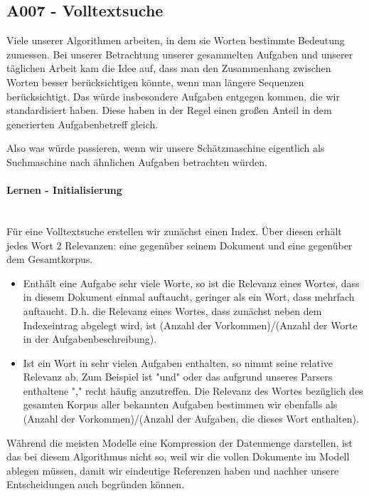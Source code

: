 \newpage{}

\subsection{A007 - Volltextsuche}

Viele unserer Algorithmen arbeiten, in dem sie Worten bestimmte Bedeutung zumessen.
Bei unserer Betrachtung unserer gesammelten Aufgaben und unserer täglichen Arbeit kam die Idee auf, dass man den Zusammenhang zwischen Worten besser berücksichtigen könnte, wenn man längere Sequenzen berücksichtigt. 
Das würde insbesondere Aufgaben entgegen kommen, die wir standardisiert haben.
Diese haben in der Regel einen großen Anteil in dem generierten Aufgabenbetreff gleich.

Also was würde passieren, wenn wir unsere Schätzmaschine eigentlich als Suchmaschine nach ähnlichen Aufgaben betrachten würden.

\paragraph{Lernen - Initialisierung}
\mbox{}\\

Für eine Volltextsuche erstellen wir zunächst einen Index. Über diesen erhält jedes Wort 2 Relevanzen: eine gegenüber seinem Dokument und eine gegenüber dem Gesamtkorpus.

\begin{itemize}
        \tightlist
        \item Enthält eine Aufgabe sehr viele Worte, so ist die Relevanz eines Wortes, dass in diesem Dokument einmal auftaucht, geringer als ein Wort, dass mehrfach auftaucht. D.h. die Relevanz eines Wortes, dass zunächst neben dem Indexeintrag abgelegt wird, ist (Anzahl der Vorkommen)/(Anzahl der Worte in der Aufgabenbeschreibung).
        \item Ist ein Wort in sehr vielen Aufgaben enthalten, so nimmt seine relative Relevanz ab. Zum Beispiel ist "und" oder das aufgrund unseres Parsers enthaltene "," recht häufig anzutreffen. Die Relevanz des Wortes bezüglich des gesamten Korpus aller bekannten Aufgaben bestimmen wir ebenfalls als (Anzahl der Vorkommen)/(Anzahl der Aufgaben, die dieses Wort enthalten).
\end{itemize}

Während die meisten Modelle eine Kompression der Datenmenge darstellen, ist das bei diesem Algorithmus nicht so, weil wir die vollen Dokumente im Modell ablegen müssen, damit wir eindeutige Referenzen haben und nachher unsere Entscheidungen auch begründen können.

